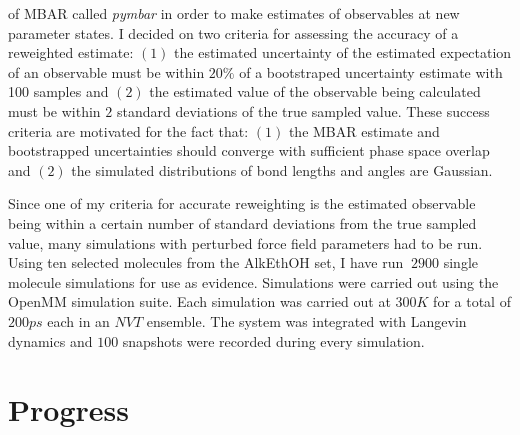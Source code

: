 \documentclass[rmp,nofootinbib,superscriptaddress,12pt,tightenlines,notitlepage]{revtex4-1}
\begin{document}
of MBAR called \textit{pymbar} in order to make estimates of observables at new parameter states. I decided on two criteria for assessing the accuracy
of a reweighted estimate: $\left(1\right)$ the estimated uncertainty of the estimated expectation of an observable must be within $20 \%$ of a bootstraped uncertainty estimate with 100 samples and $\left(2\right)$ the estimated value of the observable being calculated must be within $2$ standard deviations of the true
sampled value. These success criteria are motivated for the fact that: $\left(1\right)$ the MBAR estimate and bootstrapped uncertainties should converge with 
sufficient phase space overlap and $\left(2\right)$ the simulated distributions of bond lengths and angles are Gaussian. 

Since one of my criteria for accurate reweighting is the estimated observable being within a certain number of standard deviations from the true sampled value, many simulations with perturbed force field parameters had to be run. Using ten selected molecules from the AlkEthOH set, I have run $~2900$
single molecule simulations for use as evidence. Simulations were carried out using the OpenMM simulation suite. Each simulation was carried out at 
$300 K$ for a total of $200 ps$ each in an $NVT$ ensemble. The system was integrated with Langevin dynamics and $100$ snapshots were recorded 
during every simulation.
\section{Progress}
\end{document}

